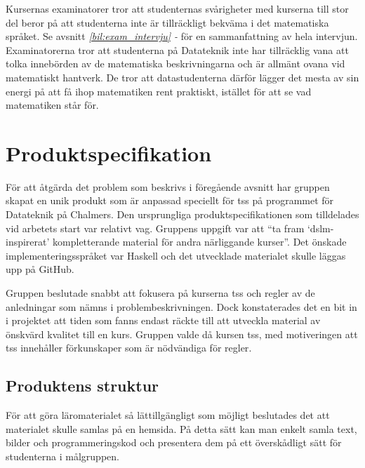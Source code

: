 \documentclass[12pt,a4paper,twoside,openright]{article}
\begin{document}
Kursernas examinatorer tror att studenternas svårigheter med kurserna
till stor del beror på att studenterna inte är tillräckligt bekväma i
det matematiska språket. Se avsnitt \textit{\ref{bil:exam_intervju} -
  } för en sammanfattning av hela
intervjun. Examinatorerna tror att studenterna på Datateknik inte har
tillräcklig vana att tolka innebörden av de matematiska
beskrivningarna och är allmänt ovana vid matematiskt hantverk. De tror att
 datastudenterna därför  lägger det mesta av sin energi på
att få ihop matematiken rent praktiskt, istället för att se vad
matematiken står för.

\newpage

\section{Produktspecifikation}

För att åtgärda det problem som beskrivs i föregående avsnitt har
gruppen skapat en unik produkt som är anpassad speciellt för \gls{tss} på
programmet för Datateknik på Chalmers. Den ursprungliga
produktspecifikationen som tilldelades vid arbetets start var
relativt vag. Gruppens uppgift var att ``ta fram `\gls{dslm}-inspirerat'
kompletterande material för andra närliggande kurser''. Det önskade
implementerings\-språket var Haskell och det utvecklade materialet
skulle läggas upp på GitHub.

Gruppen beslutade snabbt att fokusera på kurserna \gls{tss} och \gls{regler}
av de anledningar som nämns i problembeskrivningen.
Dock konstaterades
det en bit in i projektet att tiden som fanns endast räckte till att
utveckla material av önskvärd kvalitet till en kurs.
Gruppen valde då kursen
\gls{tss}, med motiveringen att \gls{tss} innehåller förkunskaper som är
nödvändiga för \gls{regler}.

\subsection{Produktens struktur}
\label{sec:prodSpec}
För att göra läromaterialet så lättillgängligt som möjligt beslutades det
att materialet skulle samlas på en hemsida. På detta sätt kan man
enkelt samla text, bilder och programmeringskod och presentera dem på
ett överskådligt sätt för studenterna i målgruppen.
\end{document}
